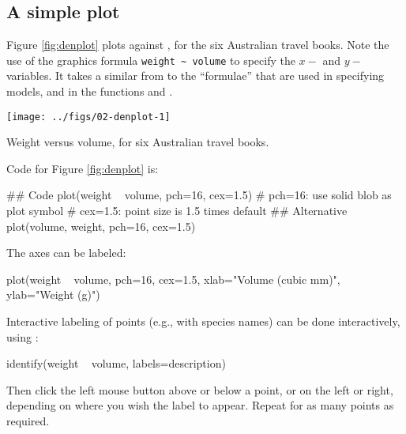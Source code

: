\subsection*{A simple plot}
Figure \ref{fig:denplot} plots  against ,
for the six Australian travel books.  Note the use of the graphics
formula \verb!weight ~ volume! to specify the $x-$ and
$y-$variables. It takes a similar from to the ``formulae'' that are
used in specifying models, and in the functions  and
.
\begin{marginfigure}
\begin{Schunk}


\centerline{\texttt{[image: ../figs/02-denplot-1]} }

\end{Schunk}
 \caption{Weight versus volume, for six Australian travel
books.}\label{fig:denplot}
\end{marginfigure}

Code for Figure \ref{fig:denplot} is:
\begin{Schunk}
\begin{Sinput}
## Code
plot(weight ~ volume, pch=16, cex=1.5)
  # pch=16: use solid blob as plot symbol
  # cex=1.5: point size is 1.5 times default
## Alternative
plot(volume, weight, pch=16, cex=1.5)
\end{Sinput}
\end{Schunk}


The axes can be labeled:
\begin{Schunk}
\begin{Sinput}
plot(weight ~ volume, pch=16, cex=1.5,
     xlab="Volume (cubic mm)", ylab="Weight (g)")
\end{Sinput}
\end{Schunk}

Interactive labeling of points   (e.g., with species names) can
be done interactively, using :
\begin{Schunk}
\begin{Sinput}
identify(weight ~ volume, labels=description)
\end{Sinput}
\end{Schunk}
Then click the left mouse button above or below a point, or on the
left or right, depending on where you wish the label to appear.
Repeat for as many points as required.


